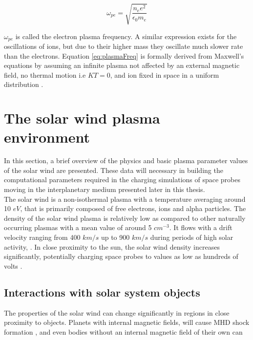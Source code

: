 \begin{equation}\label{eq:plasmaFreq}
    \omega_{pe} = \sqrt{\frac{n_e e^2}{\epsilon_0 m_e}}
\end{equation}

$\omega_{pe}$ is called the electron plasma frequency. A similar expression exists for the oscillations of ions, but due to their higher mass they oscillate much slower rate than the electrons. Equation \ref{eq:plasmaFreq} is formally derived from Maxwell's equations  by assuming an infinite plasma not affected by an external magnetic field, no thermal motion i.e $KT = 0$, and ion fixed in space  in a uniform distribution .



\section{The solar wind plasma environment}
In this section, a brief overview of the physics and basic plasma parameter values of the solar wind are presented. These data will necessary in building the computational parameters required in the charging simulations of space probes moving in the interplanetary medium presented later in this thesis.
\\
The solar wind is a non-isothermal plasma with a temperature averaging around 10 $eV$, that is primarily composed of free electrons, ions and alpha particles. The density of the solar wind plasma is relatively low as compared to other naturally occurring plasmas with a mean value of around 5 $cm^{-3}$. It flows with a drift velocity ranging from 400 $km/s$ up to 900 $km/s$ during periods of high solar activity, . In close proximity to the sun, the solar wind density increases significantly, potentially charging space probes to values as low as hundreds of volts .






\subsection*{Interactions with solar system objects}
The properties of the solar wind can change significantly in regions in close proximity to objects. Planets with internal magnetic fields, will cause MHD  shock formation , and even bodies without an internal magnetic field of their own can 

